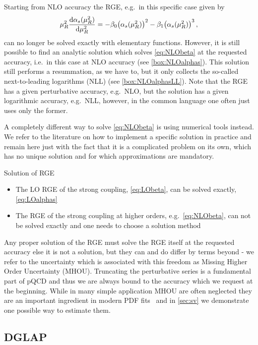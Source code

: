 Starting from NLO accuracy the RGE, e.g.\ in this specific case given by
\begin{equation}
    \mu_R^2 \dv{\alpha_s(\mu_R^2)}{\mu_R^2} = - \beta_0 \qty(\alpha_s(\mu_R^2))^2 - \beta_1 \qty(\alpha_s(\mu_R^2))^3\,, \label{eq:NLObeta}
\end{equation}
can no longer be solved exactly with elementary functions.
However, it is still possible to find an analytic solution which solves \cref{eq:NLObeta} at the requested accuracy, i.e.\ in this case at NLO accuracy (see \cref{box:NLOalphas}).
This solution still performs a resummation, as we have to, but it only collects the so-called next-to-leading logarithms (NLL) (see \cref{box:NLOalphasLL}).
Note that the RGE has a given perturbative accuracy, e.g.\ NLO, but the solution has a given logarithmic accuracy, e.g.\ NLL, however, in the common language one often just uses only the former.

A completely different way to solve \cref{eq:NLObeta} is using numerical tools instead.
We refer to the literature on how to implement a specific solution in practice and remain here just with the fact that it is a complicated problem on its own, which has no unique solution and for which approximations are mandatory.
\begin{conclusionbox}[label={box:RGE}]{Solution of RGE}
    \begin{itemize}
        \item The LO RGE of the strong coupling, \cref{eq:LObeta}, can be solved exactly, \cref{eq:LOalphas}
        \item The RGE of the strong coupling at higher orders, e.g.\ \cref{eq:NLObeta}, can not be solved exactly and one needs to choose a solution method
    \end{itemize}
\end{conclusionbox}
Any proper solution of the RGE must solve the RGE itself at the requested accuracy else it is not a solution, but they can and do differ by terms beyond - we refer to the uncertainty which is associated with this freedom as Missing Higher Order Uncertainty (MHOU).
Truncating the perturbative series is a fundamental part of pQCD and thus we are always bound to the accuracy which we request at the beginning.
While in many simple application MHOU are often neglected they are an important ingredient in modern PDF fits~\cite{NNPDF:2024dpb} and in \cref{sec:sv} we demonstrate one possible way to estimate them.

\subsection{DGLAP}
\label{sec:DGLAP}


